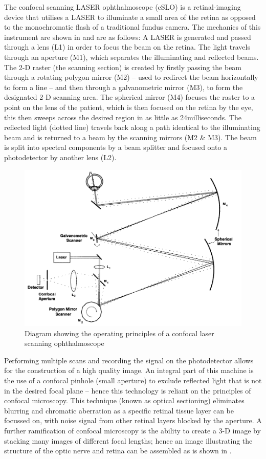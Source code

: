 The confocal scanning LASER ophthalmoscope (cSLO) is a retinal-imaging device that utilises a LASER to illuminate a small area of the retina as opposed to the monochromatic flash of a traditional fundus camera. The mechanics of this instrument are shown in and are as follows: A LASER is generated and passed through a lens (L1) in order to focus the beam on the retina. The light travels through an aperture (M1), which separates the illuminating and reflected beams. The 2-D raster (the scanning section) is created by firstly passing the beam through a rotating polygon mirror (M2) – used to redirect the beam horizontally to form a line – and then through a galvanometric mirror (M3), to form the designated 2-D scanning area. The spherical mirror (M4) focuses the raster to a point on the lens of the patient, which is then focused on the retina by the eye, this then sweeps across the desired region in as little as 24milliseconds. The reflected light (dotted line) travels back along a path identical to the illuminating beam and is returned to a beam by the scanning mirrors (M2 \& M3). The beam is split into spectral components by a beam splitter and focused onto a photodetector by another lens (L2). 

\begin{figure}[htbp]
\centering
  \includegraphics{figures/cslo}
\caption{Diagram showing the operating principles of a confocal laser scanning ophthalmoscope}
\label{fig:cslo}
\end{figure}


Performing multiple scans and recording the signal on the photodetector allows for the construction of a high quality image. An integral part of this machine is the use of a confocal pinhole (small aperture) to exclude reflected light that is not in the desired focal plane – hence this technology is reliant on the principles of confocal microscopy. This technique (known as optical sectioning) eliminates blurring and chromatic aberration as a specific retinal tissue layer can be focussed on, with noise signal from other retinal layers blocked by the aperture. A further ramification of confocal microscopy is the ability to create a 3-D image by stacking many images of different focal lengths; hence an image illustrating the structure of the optic nerve and retina can be assembled as is shown in .


